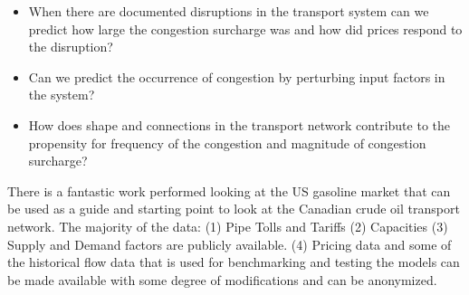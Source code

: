\documentclass[11pt, letterpaper,nounbold]{article}
\begin{document}
\begin{itemize}
	\item When there are documented disruptions in the transport system can we predict how large the congestion surcharge was and how did prices respond to the disruption?
	\item Can we predict the occurrence of congestion by perturbing input factors in the system?
	\item How does shape and connections in the transport network contribute to the propensity for frequency of the congestion and magnitude of congestion surcharge?
\end{itemize}


There is a fantastic work performed looking at the US gasoline market that can be used as a guide and starting point to look at the Canadian crude oil transport network.
The majority of the data: (1) Pipe Tolls and Tariffs (2) Capacities (3) Supply and Demand factors are publicly available. (4) Pricing data and some of the historical flow data that is used for benchmarking and testing the models can be made available with some degree of modifications and can be anonymized.      
\end{document}
